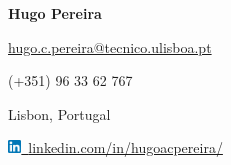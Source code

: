 \documentclass[a4paper,12pt]{article}
\begin{document}
\begin{minipage}{6.5cm}
\vspace{-1.5em}
\hspace{0.5cm}
\end{minipage}
\begin{minipage}{10.5cm}
\vspace{-1em}
\centerline{\Huge \textbf{Hugo Pereira}}
\vspace{8pt}
\centerline{\large \href{mailto:hugo.c.pereira@tecnico.ulisboa.pt}{hugo.c.pereira@tecnico.ulisboa.pt}}
\centerline{\large (+351) 96 33 62 767}
\centerline{\large Lisbon, Portugal} 
\vspace{8pt}
\centerline{\href{https://www.linkedin.com/in/hugoacpereira/}{\includegraphics[height=10pt]{Images/linkedin}~\footnotesize{linkedin.com/in/hugoacpereira/}}}
\end{minipage} 
\vspace{-10pt}
\end{document}
